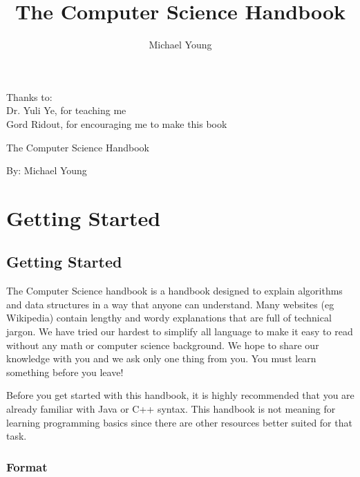 \documentclass[11pt,oneside]{book}
\title{The Computer Science Handbook}
\author{Michael Young}
\begin{document}
		
		\maketitle
		\frontmatter
		\vspace*{\fill}
		\begin{center}
			Thanks to: \\
			Dr. Yuli Ye, for teaching me\\
			Gord Ridout, for encouraging me to make this book\\
		\end{center}
		\vspace*{\fill}
		
		\mainmatter
		
		\vspace*{\fill}
		\begin{center}
		\LARGE\textsf{The Computer Science Handbook}\par
		\end{center}
		\begin{center}
		\textsf{By: Michael Young}\par
		\end{center}
		\vspace*{\fill}
		
		\tableofcontents
		\chapter{ Getting Started }
    \section{ Getting Started }
    

The Computer Science handbook is a handbook designed to explain algorithms and data structures in a way that anyone can understand. Many websites (eg Wikipedia) contain lengthy and wordy explanations that are full of technical jargon. We have tried our hardest to simplify all language to make it easy to read without any math or computer science background. We hope to share our knowledge with you and we ask only one thing from you. You must learn something before you leave!

Before you get started with this handbook, it is highly recommended that you are already familiar with Java or C++ syntax. This handbook is not meaning for learning programming basics since there are other resources better suited for that task.

\subsection{Format}
\end{document}
